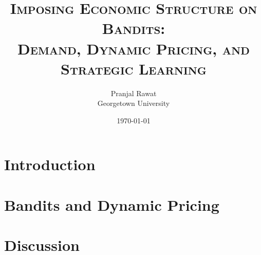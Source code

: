 %





\title{\textsc{Imposing Economic Structure on Bandits:\\ Demand, Dynamic Pricing, and Strategic Learning}}
\author{Pranjal Rawat \\ Georgetown University}
\date{\today}

\maketitle

\begin{abstract}
\noindent
\end{abstract}

\tableofcontents
\newpage

\section{Introduction}\label{section:intro}

\section{Bandits and Dynamic Pricing}\label{section:bandits}


\section{Discussion}\label{section:conclusion}






